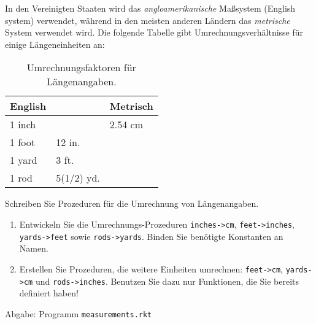 
In den Vereinigten Staaten wird das
  \emph{angloamerikanische} Ma\ss system (English system) verwendet, w\"ahrend in den
  meisten anderen L\"andern das \emph{metrische} System verwendet
  wird. Die folgende Tabelle gibt Umrechnungsverh\"altnisse f\"ur
  einige L\"angeneinheiten an:

 \begin{table}[h]
    \centering
    \begin{tabular}{l|l|l}
     English & & Metrisch \\
      \hline
      1 inch & & 2.54 cm \\
      1 foot & 12 in. &  \\
      1 yard & 3 ft. & \\
      1 rod & 5(1/2) yd. & \\
   \end{tabular}
    \caption{Umrechnungsfaktoren f\"ur L\"angenangaben.}
    \label{tab:umrechnung}
  \end{table}

Schreiben Sie Prozeduren für die Umrechnung von L\"angenangaben.

  \begin{enumerate}
  \item Entwickeln Sie die Umrechnungs-Prozeduren
    \texttt{inches->cm}, \texttt{feet->inches}, \texttt{yards->feet}
    sowie \texttt{rods->yards}. Binden Sie ben\"otigte Konstanten an Namen.
  \item Erstellen Sie Prozeduren, die weitere
    Einheiten umrechnen: \texttt{feet->cm},
    \texttt{yards->cm} und \texttt{rods->inches}.
    Benutzen Sie dazu nur Funktionen, die Sie
    bereits definiert haben!
  \end{enumerate}


Abgabe:
    Programm \texttt{measurements.rkt}


  \begin{solution}
\pagebreak
     
  \end{solution}


